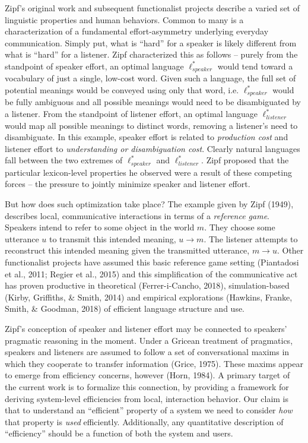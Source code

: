 \documentclass[10pt, letterpaper]{article}
\begin{document}
Zipf's original work and subsequent functionalist projects describe a
varied set of linguistic properties and human behaviors. Common to many
is a characterization of a fundamental effort-asymmetry underlying
everyday communication. Simply put, what is ``hard'' for a speaker is
likely different from what is ``hard'' for a listener. Zipf
characterized this as follows -- purely from the standpoint of speaker
effort, an optimal language \(\ell_{speaker}^*\) would tend toward a
vocabulary of just a single, low-cost word. Given such a language, the
full set of potential meanings would be conveyed using only that word,
i.e. \(\ell_{speaker}^*\) would be fully ambiguous and all possible
meanings would need to be disambiguated by a listener. From the
standpoint of listener effort, an optimal language \(\ell_{listener}^*\)
would map all possible meanings to distinct words, removing a listener's
need to disambiguate. In this example, speaker effort is related to
\emph{production cost} and listener effort to \emph{understanding or
disambiguation cost}. Clearly natural languages fall between the two
extremes of \(\ell_{speaker}^*\) and \(\ell_{listener}^*\). Zipf
proposed that the particular lexicon-level properties he observed were a
result of these competing forces -- the pressure to jointly minimize
speaker and listener effort.\par

But how does such optimization take place? The example given by Zipf
(1949), describes local, communicative interactions in terms of a
\textit{reference game}. Speakers intend to refer to some object in the
world \(m\). They choose some utterance \(u\) to transmit this intended
meaning, \(u \rightarrow m\). The listener attempts to reconstruct this
intended meaning given the transmitted utterance, \(m \rightarrow u\).
Other functionalist projects have assumed this basic reference game
setting (Piantadosi et al., 2011; Regier et al., 2015) and this
simplification of the communicative act has proven productive in
theoretical (Ferrer-i-Cancho, 2018), simulation-based (Kirby, Griffiths,
\& Smith, 2014) and empirical explorations (Hawkins, Franke, Smith, \&
Goodman, 2018) of efficient language structure and use.\par

Zipf's conception of speaker and listener effort may be connected to
speakers' pragmatic reasoning in the moment. Under a Gricean treatment
of pragmatics, speakers and listeners are assumed to follow a set of
conversational maxims in which they cooperate to transfer information
(Grice, 1975). These maxims appear to emerge from efficiency concerns,
however (Horn, 1984). A primary target of the current work is to
formalize this connection, by providing a framework for deriving
system-level efficiencies from local, interaction behavior. Our claim is
that to understand an ``efficient'' property of a system we need to
consider \emph{how} that property is \emph{used} efficiently.
Additionally, any quantitative description of ``efficiency'' should be a
function of both the system and users.\par
\end{document}
